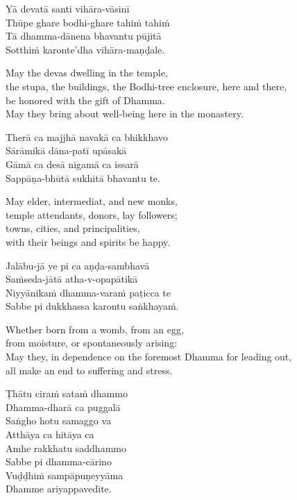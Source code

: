 Yā devatā santi vihāra-vāsinī\\
Thūpe ghare bodhi-ghare tahiṁ tahiṁ\\
Tā dhamma-dānena bhavantu pūjitā\\
Sotthiṁ karonte'dha vihāra-maṇḍale.

\begin{english}
  May the devas dwelling in the temple,\\
  the stupa, the buildings, the Bodhi-tree enclosure, here and there,\\
  be honored with the gift of Dhamma.\\
  May they bring about well-being here in the monastery.
\end{english}

Therā ca majjhā navakā ca bhikkhavo\\
Sārāmikā dāna-patī upāsakā\\
Gāmā ca desā nigamā ca issarā\\
Sappāṇa-bhūtā sukhitā bhavantu te.

\begin{english}
  May elder, intermediat, and new monks,\\
  temple attendants, donors, lay followers;\\
  towns, cities, and principalities,\\
  with their beings and spirits be happy.
\end{english}

Jalābu-jā ye pi ca aṇḍa-sambhavā\\
Saṁseda-jātā atha-v-opapātikā\\
Niyyānikaṁ dhamma-varaṁ paṭicca te\\
Sabbe pi dukkhassa karontu saṅkhayaṁ.

\begin{english}
  Whether born from a womb, from an egg,\\
  from moisture, or spontaneously arising:\\
  May they, in dependence on the foremost Dhamma for leading out,\\
  all make an end to suffering and stress.
\end{english}

Ṭhātu ciraṁ sataṁ dhammo\\
Dhamma-dharā ca puggalā\\
Saṅgho hotu samaggo va\\
Atthāya ca hitāya ca\\
Amhe rakkhatu saddhammo\\
Sabbe pi dhamma-cārino\\
Vuḍḍhiṁ sampāpuṇeyyāma\\
Dhamme ariyappavedite.

